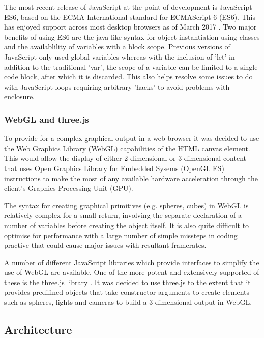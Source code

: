 \documentclass[twoside]{bhamthesis}
\begin{document}
The most recent release of JavaScript at the point of development is JavaScript ES6, based on the ECMA International standard for ECMAScript 6 (ES6). This has enjoyed support across most desktop browsers as of March 2017 \cite{zaytsev_ecmascript_2017}. Two major benefits of using ES6 are the java-like syntax for object instantiation using classes and the availablility of variables with a block scope. Previous versions of JavaScript only used global variables whereas with the inclusion of 'let' in addition to the traditional 'var', the scope of a variable can be limited to a single code block, after which it is discarded. This also helps resolve some issues to do with JavaScript loops requiring arbitrary 'hacks' to avoid problems with enclosure.


\subsubsection{WebGL and three.js}
To provide for a complex graphical output in a web browser it was decided to use the Web Graphics Library (WebGL) capabilities of the HTML canvas element. This would allow the display of either 2-dimensional or 3-dimensional content that uses Open Graphics Library for Embedded Sysems (OpenGL ES) instructions to make the most of any available hardware acceleration through the client's Graphics Processing Unit (GPU).

The syntax for creating graphical primitives (e.g. spheres, cubes) in WebGL is relatively complex for a small return, involving the separate declaration of a number of variables before creating the object itself. It is also quite difficult to optimise for performance with a large number of simple missteps in coding practive that could cause major issues with resultant framerates.

A number of different JavaScript libraries which provide interfaces to simplify the use of WebGL are available. One of the more potent and extensively supported of these is the three.js library \cite{cabello_three.js_????}. It was decided to use three.js to the extent that it provides predifined objects that take constructor arguments to create elements such as spheres, lights and cameras to build a 3-dimensional output in WebGL.

\subsection{Architecture}
\end{document}
